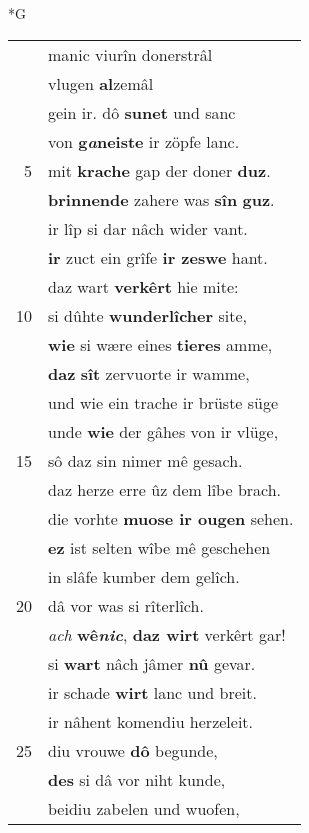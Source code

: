 \documentclass[8pt,a4paper,notitlepage]{article}
\begin{document}
\begin{table}[ht]
\begin{minipage}[t]{0.5\linewidth}
\small
\begin{center}*G
\end{center}
\begin{tabular}{rl}
 & manic viurîn donerstrâl\\ 
 & vlugen \textbf{al}zemâl\\ 
 & gein ir. dô \textbf{sunet} und sanc\\ 
 & von \textbf{g\textit{a}neiste} ir zöpfe lanc.\\ 
5 & mit \textbf{krache} gap der doner \textbf{duz}.\\ 
 & \textbf{brinnende} zahere was \textbf{sîn} \textbf{guz}.\\ 
 & ir lîp si dar nâch wider vant.\\ 
 & \textbf{ir} zuct ein grîfe \textbf{ir zeswe} hant.\\ 
 & daz wart \textbf{verkêrt} hie mite:\\ 
10 & si dûhte \textbf{wunderlîcher} site,\\ 
 & \textbf{wie} si wære eines \textbf{tieres} amme,\\ 
 & \textbf{daz} \textbf{sît} zervuorte ir wamme,\\ 
 & und wie ein trache ir brüste süge\\ 
 & unde \textbf{wie} der gâhes von ir vlüge,\\ 
15 & sô daz sin nimer mê gesach.\\ 
 & daz herze erre ûz dem lîbe brach.\\ 
 & die vorhte \textbf{muose ir ougen} sehen.\\ 
 & \textbf{ez} ist selten wîbe mê geschehen\\ 
 & in slâfe kumber dem gelîch.\\ 
20 & dâ vor was si rîterlîch.\\ 
 & \textit{ach} \textbf{wê\textit{nic}}, \textbf{daz wirt} verkêrt gar!\\ 
 & si \textbf{wart} nâch jâmer \textbf{nû} gevar.\\ 
 & ir schade \textbf{wirt} lanc und breit.\\ 
 & ir nâhent komendiu herzeleit.\\ 
25 & diu vrouwe \textbf{dô} begunde,\\ 
 & \textbf{des} si dâ vor niht kunde,\\ 
 & beidiu zabelen und wuofen,\\ 

\end{tabular}
\end{minipage}
\end{table}
\end{document}
